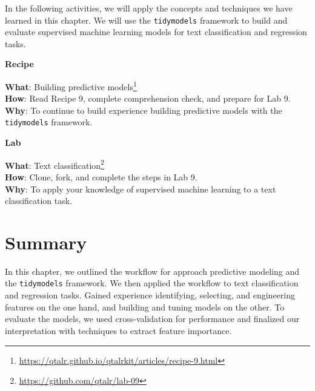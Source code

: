 \documentclass[
  letterpaper,
]{latex/krantz}
\theoremstyle{definition}
\theoremstyle{remark}
\DeclareRobustCommand{\href}[2]{#2\footnote{\url{#1}}}
\begin{document}

In the following activities, we will apply the concepts and techniques
we have learned in this chapter. We will use the \texttt{tidymodels}
framework to build and evaluate supervised machine learning models for
text classification and regression tasks.

\begin{tcolorbox}[enhanced jigsaw, colback=white, colframe=quarto-callout-color-frame, leftrule=.75mm, opacityback=0, rightrule=.15mm, bottomrule=.15mm, toprule=.15mm, breakable, left=2mm, arc=.35mm]

\textbf{ Recipe}

\textbf{What}:
\href{https://qtalr.github.io/qtalrkit/articles/recipe-9.html}{Building
predictive models}\\
\textbf{How}: Read Recipe 9, complete comprehension check, and prepare
for Lab 9.\\
\textbf{Why}: To continue to build experience building predictive models
with the \texttt{tidymodels} framework.

\end{tcolorbox}

\begin{tcolorbox}[enhanced jigsaw, colback=white, colframe=quarto-callout-color-frame, leftrule=.75mm, opacityback=0, rightrule=.15mm, bottomrule=.15mm, toprule=.15mm, breakable, left=2mm, arc=.35mm]

\textbf{ Lab}

\textbf{What}: \href{https://github.com/qtalr/lab-09}{Text
classification}\\
\textbf{How}: Clone, fork, and complete the steps in Lab 9.\\
\textbf{Why}: To apply your knowledge of supervised machine learning to
a text classification task.

\end{tcolorbox}

\section*{Summary}\label{summary-8}


In this chapter, we outlined the workflow for approach predictive
modeling and the \texttt{tidymodels} framework. We then applied the
workflow to text classification and regression tasks. Gained experience
identifying, selecting, and engineering features on the one hand, and
building and tuning models on the other. To evaluate the models, we used
cross-validation for performance and finalized our interpretation with
techniques to extract feature importance.
\end{document}
